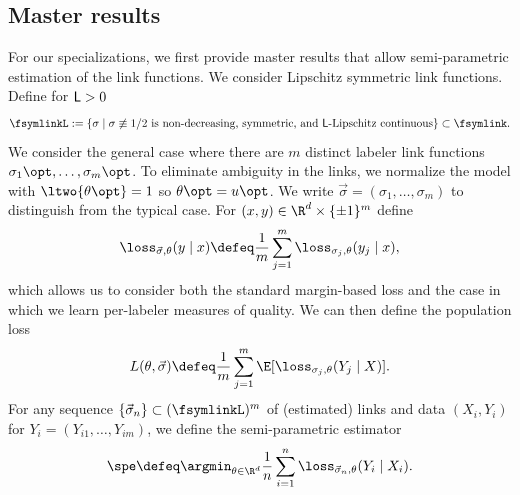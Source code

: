 \subsection{Master results}
\label{sec:master-results-sem}

For our specializations, we first provide master results that
allow semi-parametric estimation of the link functions.  We consider
Lipschitz symmetric link functions. Define for $\mathsf{L} > 0$
\begin{align*}
  \fsymlinkL := \{\sigma \mid \sigma \not \equiv 1/2\text{ is non-decreasing,
    symmetric, and} ~ \lipconst\text{-Lipschitz continuous} \}
  \subset \fsymlink.
\end{align*}
We consider the general case where there are $m$ distinct labeler link
functions $\sigma_1\opt, \ldots, \sigma_m\opt$. To eliminate ambiguity
in the links, we
normalize the model with $\ltwo{\theta\opt} = 1$ so $\theta\opt
= u\opt$. We write $\vec{\sigma} = (\sigma_1, \ldots, \sigma_m)$ to distinguish from the typical case. For
$(x, y) \in \R^d \times \{\pm 1\}^m$ define
\begin{equation*}
  \loss_{\vec{\sigma}, \theta}(y \mid x)
  \defeq \frac{1}{m} \sum_{j = 1}^m \loss_{\sigma_j,\theta}(y_j \mid x),
\end{equation*}
which allows us to consider both the standard margin-based loss and the case
in which we learn per-labeler measures of quality.
We can then define the population
loss
\begin{equation*}
	L(\theta, \vec{\sigma})
	\defeq \frac{1}{m} \sum_{j = 1}^m
	\E[\loss_{\sigma_j, \theta}(Y_j \mid X)].
\end{equation*}
For any sequence $\{\vec{\sigma}_n\} \subset (\fsymlinkL)^m$ of (estimated)
links
and data
$(X_i, Y_i)$ for $Y_i = (Y_{i1}, \ldots, Y_{im})$, we define the semi-parametric
estimator
\begin{align*}
  \spe \defeq \argmin_{\theta \in \R^d}
  \frac{1}{n} \sum_{i = 1}^n
  \loss_{\vec{\sigma}_n, \theta}(Y_i \mid X_i).
\end{align*}


